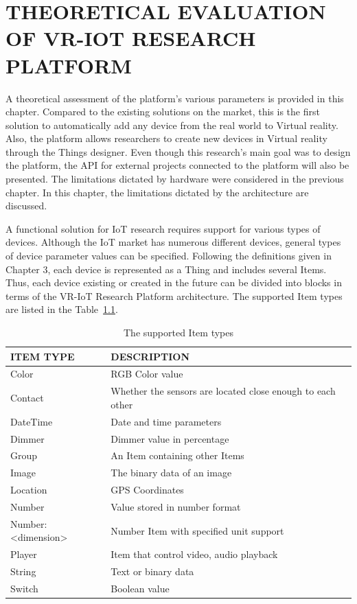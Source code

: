 
\chapter{THEORETICAL EVALUATION OF VR-IOT RESEARCH PLATFORM}

A theoretical assessment of the platform's various parameters is provided in this chapter. Compared to the existing solutions on the market, this is the first solution to automatically add any device from the real world to Virtual reality. Also, the platform allows researchers to create new devices in Virtual reality through the Things designer. Even though this research's main goal was to design the platform, the API for external projects connected to the platform will also be presented. The limitations dictated by hardware were considered in the previous chapter. In this chapter, the limitations dictated by the architecture are discussed.

A functional solution for IoT research requires support for various types of devices. Although the IoT market has numerous different devices, general types of device parameter values ​​can be specified. Following the definitions given in Chapter 3, each device is represented as a Thing and includes several Items. Thus, each device existing or created in the future can be divided into blocks in terms of the VR-IoT Research Platform architecture. The supported Item types are listed in the Table~\ref{tab:items-table}.

\begin{table}
  \centering
  \begin{threeparttable}[c]
    \caption{The supported Item types}
    \label{tab:items-table}
    \begin{tabular}{ll}
      \toprule
      ITEM TYPE    &         DESCRIPTION                 \\
      \midrule
      Color &	RGB Color value \\
      Contact & Whether the sensors are located close enough to each other \\
      DateTime & Date and time parameters \\
      Dimmer &	Dimmer value in percentage \\
      Group &	An Item containing other Items \\
      Image &	The binary data of an image \\
      Location & GPS Coordinates \\
      Number & Value stored in number format \\
      Number:<dimension> & Number Item with specified unit support \\
      Player & Item that control video, audio playback \\
      String &	Text or binary data \\
      Switch & Boolean value \\
      \bottomrule
    \end{tabular}
  \end{threeparttable}
\end{table}

